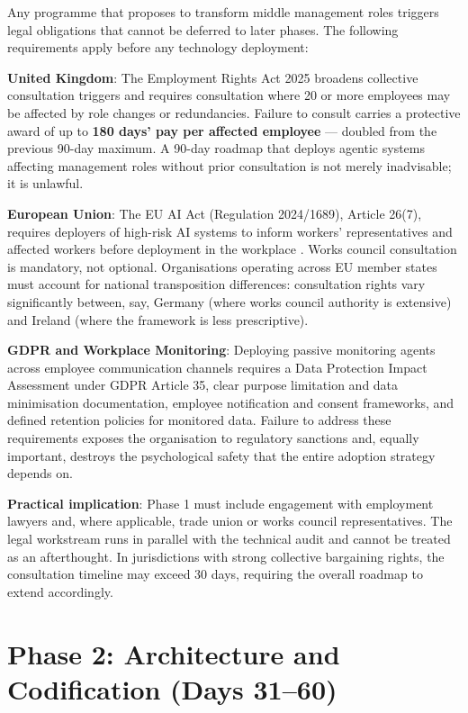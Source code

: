\begin{cautionbox}[title={Employment Law and Consultation Obligations}]
Any programme that proposes to transform middle management roles triggers legal obligations that cannot be deferred to later phases. The following requirements apply before any technology deployment:

\textbf{United Kingdom}: The Employment Rights Act 2025 \parencite{ERA2025} broadens collective consultation triggers and requires consultation where 20 or more employees may be affected by role changes or redundancies. Failure to consult carries a protective award of up to \textbf{180 days' pay per affected employee} --- doubled from the previous 90-day maximum. A 90-day roadmap that deploys agentic systems affecting management roles without prior consultation is not merely inadvisable; it is unlawful.

\textbf{European Union}: The EU AI Act (Regulation 2024/1689), Article 26(7), requires deployers of high-risk AI systems to inform workers' representatives and affected workers before deployment in the workplace \parencite{EUAIAct2025}. Works council consultation is mandatory, not optional. Organisations operating across EU member states must account for national transposition differences: consultation rights vary significantly between, say, Germany (where works council authority is extensive) and Ireland (where the framework is less prescriptive).

\textbf{GDPR and Workplace Monitoring}: Deploying passive monitoring agents across employee communication channels requires a Data Protection Impact Assessment under GDPR Article 35, clear purpose limitation and data minimisation documentation, employee notification and consent frameworks, and defined retention policies for monitored data. Failure to address these requirements exposes the organisation to regulatory sanctions and, equally important, destroys the psychological safety that the entire adoption strategy depends on.

\textbf{Practical implication}: Phase 1 must include engagement with employment lawyers and, where applicable, trade union or works council representatives. The legal workstream runs in parallel with the technical audit and cannot be treated as an afterthought. In jurisdictions with strong collective bargaining rights, the consultation timeline may exceed 30 days, requiring the overall roadmap to extend accordingly.
\end{cautionbox}

\section{Phase 2: Architecture and Codification (Days 31--60)}

